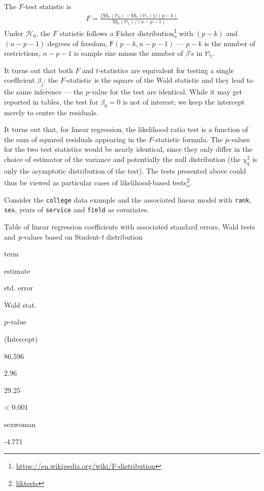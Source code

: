 \documentclass[
  11pt,
  letterpaper,
]{book}
\renewcommand{\href}[2]{#2\footnote{\url{#1}}}
\theoremstyle{definition}
\theoremstyle{definition}
\theoremstyle{definition}
\theoremstyle{remark}
\begin{document}
The \(F\)-test statistic is
\begin{align*}
F=\frac{\{\mathsf{SS}_e(\mathbb{M}_0)-\mathsf{SS}_e(\mathbb{M}_1)\}/(p-k)}{\mathsf{SS}_e(\mathbb{M}_1)/(n-p-1)}
\end{align*}
Under \(\mathscr{H}_0\), the \(F\) statistic follows a \href{https://en.wikipedia.org/wiki/F-distribution}{Fisher distribution} with \((p-k)\) and \((n-p-1)\) degrees of freedom, \(\mathsf{F}(p-k, n-p-1)\) --- \(p-k\) is the number of restrictions, \(n-p-1\) is sample size minus the number of \(\beta\)'s in \(\mathbb{M}_1\).

It turns out that both \(F\) and \(t\)-statistics are equivalent for testing a single coefficient \(\beta_j\): the \(F\)-statistic is the square of the Wald statistic and they lead to the same inference --- the \(p\)-value for the test are identical. While it may get reported in tables, the test for \(\beta_0=0\) is not of interest; we keep the intercept merely to centre the residuals.

It turns out that, for linear regression, the likelihood ratio test is a function of the sum of squared residuals appearing in the \(F\)-statistic formula. The \(p\)-values for the two test statistics would be nearly identical, since they only differ in the choice of estimator of the variance and potentially the null distribution (the \(\chi^2_q\) is only the asymptotic distribution of the test). The tests presented above could thus be viewed as particular cases of \href{liktests}{likelihood-based tests}.

Consider the \texttt{college} data example and the associated linear model with \texttt{rank}, \texttt{sex}, years of \texttt{service} and \texttt{field} as covariates.

\label{tab:summarytestslmcollege}Table of linear regression coefficients with associated standard errors, Wald tests and \emph{p}-values based on Student-\emph{t} distribution

term

estimate

std. error

Wald stat.

p-value

(Intercept)

86.596

2.96

29.25

\textless{} 0.001

sexwoman

-4.771
\end{document}

